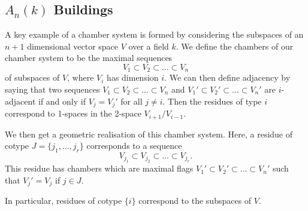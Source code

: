 \documentclass[11pt]{article}
\begin{document}




\subsection{$A_n(k)$ Buildings}

A key example of a chamber system is formed by considering the subspaces of an $n+1$ dimensional vector space $V$ over a field $k$. We define the chambers of our chamber system to be the maximal sequences \[V_1\subset V_2\subset ...\subset V_n\] of subspaces of $V$, where $V_i$ has dimension $i$. We can then define adjacency by saying that two sequences $V_1\subset V_2\subset ...\subset V_n$ and $V_1'\subset V_2'\subset ...\subset V_n'$ are $i$-adjacent if and only if $V_j=V_j'$ for all $j\neq i$. Then the residues of type $i$ correspond to 1-spaces in the 2-space $V_{i+1}/V_{i-1}$. 

We then get a geometric realisation of this chamber system. Here, a residue of cotype $J=\{j_1,...,j_r\}$ corresponds to a sequence \[V_{j_1}\subset V_{j_2}\subset ...\subset V_{j_r}.\] This residue has chambers which are maximal flags $V_1'\subset V_2'\subset ...\subset V_n'$ such that $V_j'=V_j$ if $j\in J$. 

In particular, residues of cotype $\{i\}$ correspond to the subspaces of $V$. 
\end{document}
